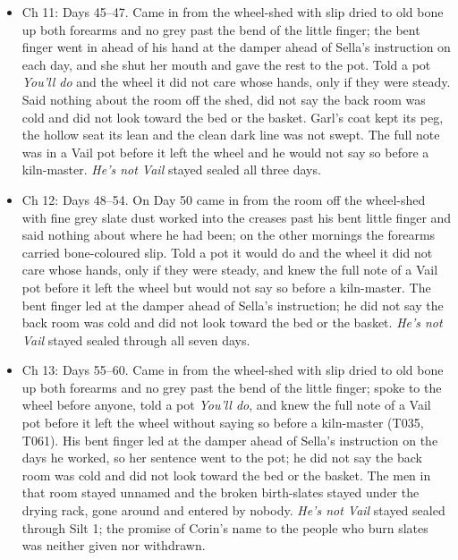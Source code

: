 \documentclass{design/chronicle}
\begin{document}
{\begin{itemize}[leftmargin=1.4em,itemsep=1pt,topsep=3pt,parsep=0pt]
\item Ch 11: Days 45–47. Came in from the wheel-shed with slip dried to old bone up both forearms and no grey past the bend of the little finger; the bent finger went in ahead of his hand at the damper ahead of Sella’s instruction on each day, and she shut her mouth and gave the rest to the pot. Told a pot \emph{You’ll do} and the wheel it did not care whose hands, only if they were steady. Said nothing about the room off the shed, did not say the back room was cold and did not look toward the bed or the basket. Garl’s coat kept its peg, the hollow seat its lean and the clean dark line was not swept. The full note was in a Vail pot before it left the wheel and he would not say so before a kiln-master. \emph{He’s not Vail} stayed sealed all three days.

\end{itemize}

\begin{itemize}[leftmargin=1.4em,itemsep=1pt,topsep=3pt,parsep=0pt]

\item Ch 12: Days 48–54. On Day 50 came in from the room off the wheel-shed with fine grey slate dust worked into the creases past his bent little finger and said nothing about where he had been; on the other mornings the forearms carried bone-coloured slip. Told a pot it would do and the wheel it did not care whose hands, only if they were steady, and knew the full note of a Vail pot before it left the wheel but would not say so before a kiln-master. The bent finger led at the damper ahead of Sella’s instruction; he did not say the back room was cold and did not look toward the bed or the basket. \emph{He’s not Vail} stayed sealed through all seven days.

\end{itemize}

\begin{itemize}[leftmargin=1.4em,itemsep=1pt,topsep=3pt,parsep=0pt]

\item Ch 13: Days 55--60. Came in from the wheel-shed with slip dried to old bone up both forearms and no grey past the bend of the little finger; spoke to the wheel before anyone, told a pot \emph{You’ll do}, and knew the full note of a Vail pot before it left the wheel without saying so before a kiln-master (T035, T061). His bent finger led at the damper ahead of Sella’s instruction on the days he worked, so her sentence went to the pot; he did not say the back room was cold and did not look toward the bed or the basket. The men in that room stayed unnamed and the broken birth-slates stayed under the drying rack, gone around and entered by nobody. \emph{He’s not Vail} stayed sealed through Silt 1; the promise of Corin’s name to the people who burn slates was neither given nor withdrawn.


\end{itemize}}
\end{document}
